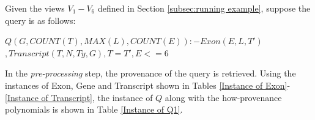 \begin{example}
Given the views $V_1-V_6$ defined in Section \ref{subsec:running example}, suppose the query is as follows:
\begin{tabbing}
$Q(G, COUNT(T), MAX(L), COUNT(E)):-Exon(E, L, T')$\\
\tab\tab$,Transcript(T, N, Ty, G), T = T', E <= 6$
\end{tabbing}
In the {\em pre-processing} step,  the provenance of the query is retrieved. Using the instances of Exon, Gene and Transcript shown in Tables \ref{Instance of Exon}-\ref{Instance of Transcript}, the instance of $Q$ along with the how-provenance polynomials is shown in Table \ref{Instance of Q1}. 


\end{example}
